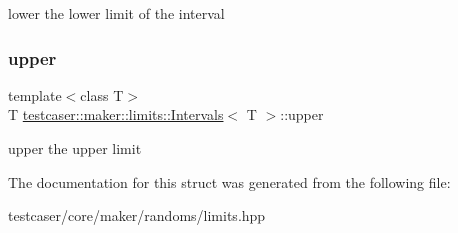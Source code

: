 lower the lower limit of the interval 

\mbox{\label{structtestcaser_1_1maker_1_1limits_1_1Intervals_ae8f8bf8607c83b429729bd36e74699dd}} 
\subsubsection{\texorpdfstring{upper}{upper}}
{\footnotesize\ttfamily template$<$class T$>$ \\
T \mbox{\hyperlink{structtestcaser_1_1maker_1_1limits_1_1Intervals}{testcaser\+::maker\+::limits\+::\+Intervals}}$<$ T $>$\+::upper}



upper the upper limit 



The documentation for this struct was generated from the following file\+:\begin{DoxyCompactItemize}
\item 
testcaser/core/maker/randoms/limits.\+hpp\end{DoxyCompactItemize}
